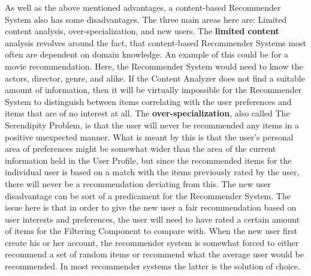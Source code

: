 As well as the above mentioned advantages, a content-based Recommender System also has some disadvantages. The three main areas here are: Limited content analysis, over-specialization, and new users.\newline
The \textbf{limited content} analysis revolves around the fact, that content-based Recommender Systems most often are dependent on domain knowledge. An example of this could be for a movie recommendation. Here, the Recommender System would need to know the actors, director, genre, and alike. If the Content Analyzer does not find a suitable amount of information, then it will be virtually impossible for the Recommender System to distinguish between items correlating with the user preferences and items that are of no interest at all.\newline
The \textbf{over-specialization}, also called The Serendipity Problem, is that the user will never be recommended any items in a positive unexpected manner. What is meant by this is that the user's personal area of preferences might be somewhat wider than the area of the current information held in the User Profile, but since the recommended items for the individual user is based on a match with the items previously rated by the user, there will never be a recommendation deviating from this.\newline
The new user disadvantage can be sort of a predicament for the Recommender System. The issue here is that in order to give the new user a fair recommendation based on user interests and preferences, the user will need to have rated a certain amount of items for the Filtering Component to compare with. When the new user first create his or her account, the recommender system is somewhat forced to either recommend a set of random items or recommend what the average user would be recommended. In most recommender systems the latter is the solution of choice.

